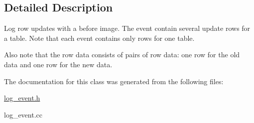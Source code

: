 \subsection{Detailed Description}
Log row updates with a before image. The event contain several update rows for a table. Note that each event contains only rows for one table.

Also note that the row data consists of pairs of row data\+: one row for the old data and one row for the new data. 

The documentation for this class was generated from the following files\+:\begin{DoxyCompactItemize}
\item 
\mbox{\hyperlink{log__event_8h}{log\+\_\+event.\+h}}\item 
log\+\_\+event.\+cc\end{DoxyCompactItemize}
